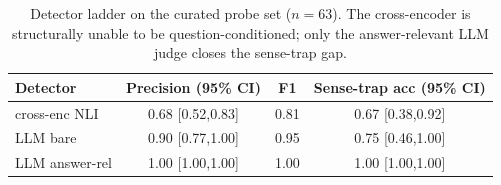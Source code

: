 \begin{table}[t]
\centering
\small
\begin{tabular}{lccc}
\toprule
Detector & Precision (95\% CI) & F1 & Sense-trap acc (95\% CI) \\
\midrule
cross-enc NLI & 0.68 [0.52,0.83] & 0.81 & 0.67 [0.38,0.92] \\
LLM bare & 0.90 [0.77,1.00] & 0.95 & 0.75 [0.46,1.00] \\
LLM answer-rel & 1.00 [1.00,1.00] & 1.00 & 1.00 [1.00,1.00] \\
\bottomrule
\end{tabular}
\caption{Detector ladder on the curated probe set ($n=63$). The cross-encoder is structurally
unable to be question-conditioned; only the answer-relevant LLM judge closes the sense-trap gap.}
\label{tab:detector_ladder}
\end{table}
